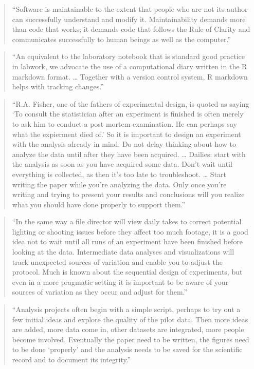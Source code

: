 \documentclass[]{tufte-book}
\begin{document}
\begin{quote}
``Software is maintainable to the extent that people who are not its author can
successfully understand and modify it. Maintainability demands more than code that
works; it demands code that follows the Rule of Clarity and communicates successfully
to human beings as well as the computer.'' \citep{raymond2003art}
\end{quote}

\begin{quote}
``An equivalent to the laboratory notebook that is standard good practice in
labwork, we advocate the use of a computational diary written in the R markdown
format. \ldots{} Together with a version control system, R markdown helps with
tracking changes.'' \citep{holmes2018modern}
\end{quote}

\begin{quote}
``R.A. Fisher, one of the fathers of experimental design, is quoted as
saying `To consult the statistician after an experiment is finished is
often merely to ask him to conduct a post mortem examination. He can
perhaps say what the expierment died of.' So it is important to design an
experiment with the analysis already in mind. Do not delay thinking about
how to analyze the data until after they have been acquired. \ldots{}
Dailies: start with the analysis as soon as you have acquired some data.
Don't wait until everything is collected, as then it's too late to
troubleshoot. \ldots{} Start writing the paper while you're analyzing the data.
Only once you're writing and trying to present your results and
conclusions will you realize what you should have done properly to support
them.'' \citep{holmes2018modern}
\end{quote}

\begin{quote}
``In the same way a file director will view daily takes to correct potential
lighting or shooting issues before they affect too much footage, it is a
good idea not to wait until all runs of an experiment have been finished
before looking at the data. Intermediate data analyses and visualizations
will track unexpected sources of variation and enable you to adjust the
protocol. Much is known about the sequential design of experiments, but
even in a more pragmatic setting it is important to be aware of your sources
of variation as they occur and adjust for them.'' \citep{holmes2018modern}
\end{quote}

\begin{quote}
``Analysis projects often begin with a simple script, perhaps to try out a
few initial ideas and explore the quality of the pilot data. Then more ideas are
added, more data come in, other datasets are integrated, more people become
involved. Eventually the paper need to be written, the figures need to be done
`properly' and the analysis needs to be saved for the scientific record and
to document its integrity.'' \citep{holmes2018modern}
\end{quote}
\end{document}
